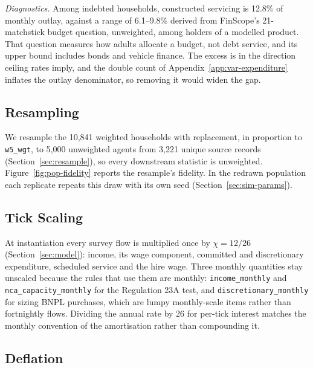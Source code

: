 \emph{Diagnostics.} Among indebted households, constructed servicing is 12.8\% of monthly
outlay, against a range of 6.1--9.8\% derived from \ac{FinScope}'s 21-matchstick budget question,
unweighted, among holders of a modelled product. That question measures how adults allocate a
budget, not debt service, and its upper bound includes bonds and vehicle finance. The excess is in the direction ceiling rates imply, and the double count of Appendix~\ref{app:var-expenditure}
inflates the outlay denominator, so removing it would widen the gap.

\subsection{Resampling}
\label{app:var-resample}

We resample the 10{,}841 weighted households with replacement, in proportion to
\texttt{w5\_wgt}, to 5{,}000 unweighted agents from 3{,}221 unique source records
(Section~\ref{sec:resample}), so every downstream statistic is unweighted.
Figure~\ref{fig:pop-fidelity} reports the resample's fidelity. In the redrawn population each
replicate repeats this draw with its own seed (Section~\ref{sec:sim-params}).

\subsection{Tick Scaling}
\label{app:var-tick}

At instantiation every survey flow is multiplied once by $\chi = 12/26$
(Section~\ref{sec:model}): income, its wage component, committed and discretionary expenditure,
scheduled service and the hire wage. Three monthly quantities stay unscaled because the rules
that use them are monthly: \texttt{income\_monthly} and \texttt{nca\_capacity\_monthly}
for the Regulation 23A test, and \texttt{discretionary\_monthly} for sizing \ac{BNPL} purchases,
which are lumpy monthly-scale items rather than fortnightly flows. Dividing the annual rate by 26
for per-tick interest matches the monthly convention of the amortisation rather than compounding
it.

\subsection{Deflation}
\label{app:var-deflation}

